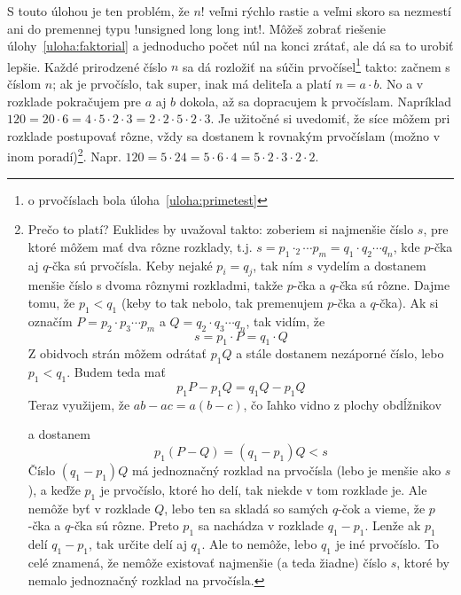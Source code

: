 S touto úlohou je ten problém, že $n!$ veľmi rýchlo rastie a veľmi skoro sa nezmestí ani
do premennej typu \prg!unsigned long long int!. Môžeš zobrať riešenie 
úlohy~\ref{uloha:faktorial} a jednoducho počet núl na konci zrátať, ale
dá sa to urobiť lepšie. 
Každé prirodzené číslo $n$ sa dá rozložiť na súčin prvočísel\footnote{o prvočíslach bola 
úloha~\ref{uloha:primetest}} takto: začnem s číslom $n$; ak je prvočíslo, tak super,
inak má deliteľa a platí $n=a\cdot b$. No a v rozklade pokračujem pre $a$ aj $b$ dokola,
až sa dopracujem k prvočíslam. Napríklad $120=20\cdot6=4\cdot5\cdot2\cdot3=
2\cdot2\cdot5\cdot2\cdot3$. Je užitočné si uvedomiť, že síce môžem pri rozklade postupovať
rôzne, vždy sa dostanem k rovnakým prvočíslam (možno
v inom poradí)\footnote{%
  Prečo to platí? Euklides by uvažoval takto: zoberiem si najmenšie číslo $s$,
  pre ktoré môžem mať dva rôzne rozklady, t.j. 
  $s=p_1\cdotp_2\cdots p_m=q_1\cdot q_2\cdots q_n$, kde $p$-čka aj $q$-čka sú prvočísla.
  Keby nejaké $p_i=q_j$, tak ním $s$ vydelím a dostanem menšie číslo s dvoma rôznymi
  rozkladmi, takže $p$-čka a $q$-čka sú rôzne. Dajme tomu, že $p_1<q_1$ (keby to tak nebolo,
  tak premenujem $p$-čka a $q$-čka). Ak si označím $P=p_2\cdot p_3\cdots p_m$
  a $Q=q_2\cdot q_3\cdots q_n$, tak vidím, že
  $$s=p_1\cdot P = q_1\cdot Q$$
  Z obidvoch strán môžem odrátať $p_1Q$ a stále dostanem nezáporné číslo, lebo $p_1<q_1$.
  Budem teda mať
  $$p_1P-p_1Q=q_1Q-p_1Q$$
  Teraz využijem, že $ab-ac=a(b-c)$, čo ľahko vidno z plochy obdĺžnikov

  \centerline{}
  a dostanem
  $$p_1(P-Q)=(q_1-p_1)Q<s$$
  Číslo $(q_1-p_1)Q$ má jednoznačný rozklad na prvočísla (lebo je menšie ako $s$), a keďže
  $p_1$ je prvočíslo, ktoré ho delí, 
  tak niekde v tom rozklade je. Ale nemôže byť v rozklade $Q$, lebo
  ten sa skladá so samých $q$-čok a vieme, že $p$-čka a $q$-čka sú rôzne. Preto $p_1$ sa
  nachádza v rozklade $q_1-p_1$. Lenže ak $p_1$ delí $q_1-p_1$, tak určite delí aj
  $q_1$. Ale to nemôže, lebo $q_1$ je iné prvočíslo. To celé znamená, že nemôže existovať
  najmenšie (a teda žiadne) číslo $s$, ktoré by nemalo jednoznačný rozklad na prvočísla.
}. Napr. $120=5\cdot24=5\cdot6\cdot4=5\cdot2\cdot3\cdot2\cdot2$.

